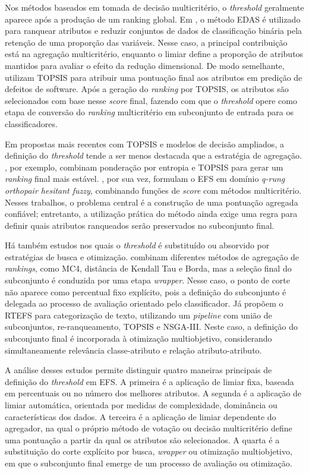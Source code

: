 Nos métodos baseados em tomada de decisão multicritério, o \textit{threshold} geralmente aparece após a produção de um ranking global. Em , o método EDAS é utilizado para ranquear atributos e reduzir conjuntos de dados de classificação binária pela retenção de uma proporção das variáveis. Nesse caso, a principal contribuição está na agregação multicritério, enquanto o limiar define a proporção de atributos mantidos para avaliar o efeito da redução dimensional. De modo semelhante,  utilizam TOPSIS para atribuir uma pontuação final aos atributos em predição de defeitos de software. Após a geração do \textit{ranking} por TOPSIS, os atributos são selecionados com base nesse \textit{score} final, fazendo com que o \textit{threshold} opere como etapa de conversão do \textit{ranking} multicritério em subconjunto de entrada para os classificadores.

Em propostas mais recentes com TOPSIS e modelos de decisão ampliados, a definição do \textit{threshold} tende a ser menos destacada que a estratégia de agregação. , por exemplo, combinam ponderação por entropia e TOPSIS para gerar um \textit{ranking} final mais estável. , por sua vez, formulam o EFS em domínio \textit{q-rung orthopair hesitant fuzzy}, combinando funções de \textit{score} com métodos multicritério. Nesses trabalhos, o problema central é a construção de uma pontuação agregada confiável; entretanto, a utilização prática do método ainda exige uma regra para definir quais atributos ranqueados serão preservados no subconjunto final.

Há também estudos nos quais o \textit{threshold} é substituído ou absorvido por estratégias de busca e otimização.  combinam diferentes métodos de agregação de \textit{rankings}, como MC4, distância de Kendall Tau e Borda, mas a seleção final do subconjunto é conduzida por uma etapa \textit{wrapper}. Nesse caso, o ponto de corte não aparece como percentual fixo explícito, pois a definição do subconjunto é delegada ao processo de avaliação orientado pelo classificador. Já  propõem o RTEFS para categorização de texto, utilizando um \textit{pipeline} com união de subconjuntos, re-ranqueamento, TOPSIS e NSGA-III. Neste caso, a definição do subconjunto final é incorporada à otimização multiobjetivo, considerando simultaneamente relevância classe-atributo e relação atributo-atributo.

A análise desses estudos permite distinguir quatro maneiras principais de definição do \textit{threshold} em EFS. A primeira é a aplicação de limiar fixa, baseada em percentuais ou no número dos melhores atributos. A segunda é a aplicação de limiar automática, orientada por medidas de complexidade, dominância ou características dos dados. A terceira é a aplicação de limiar dependente do agregador, na qual o próprio método de votação ou decisão multicritério define uma pontuação a partir da qual os atributos são selecionados. A quarta é a substituição do corte explícito por busca, \textit{wrapper} ou otimização multiobjetivo, em que o subconjunto final emerge de um processo de avaliação ou otimização.

